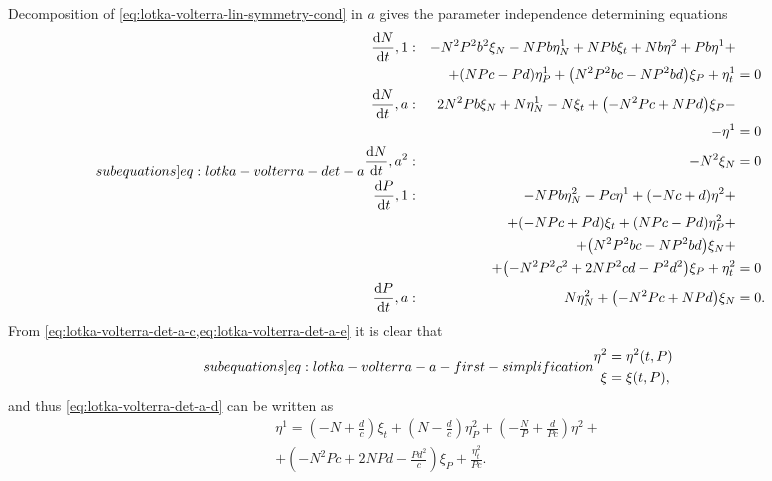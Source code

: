 Decomposition of \cref{eq:lotka-volterra-lin-symmetry-cond} in \(a\) gives the parameter independence determining equations
\begin{subequations} \label[subequations]{eq:lotka-volterra-det-a}
  \begin{flalign}
    \diff{N}{t}, 1 & : & - N^{2} P^{2} b^{2} \xi_{N} - N P b \eta^1_{N} + N P b \xi_{t} + N b \eta^{2} + P b \eta^{1} +&&\\
    &&\quad+ \left(N P c - P d\right) \eta^1_{P} + \left(N^{2} P^{2} b c - N P^{2} b d\right) \xi_{P} + \eta^1_{t} &= 0 &\label{eq:lotka-volterra-det-a-a}\\
    \diff{N}{t}, a & : & 2 N^{2} P b \xi_{N} + N \eta^1_{N} - N \xi_{t} + \left(- N^{2} P c + N P d\right) \xi_{P} -&&\\
    &&\quad- \eta^{1} &= 0 &\label{eq:lotka-volterra-det-a-b}\\
    \diff{N}{t}, a^2 & : & - N^{2} \xi_{N} &= 0 &\label{eq:lotka-volterra-det-a-c}\\
    \diff{P}{t}, 1 & : & - N P b \eta^2_{N} - P c \eta^{1} + \left(- N c + d\right) \eta^{2} +&&\\
    &&\quad+  \left(- N P c + P d\right) \xi_{t} + \left(N P c - P d\right) \eta^2_{P} +&&\\
    &&\quad+ \left(N^{2} P^{2} b c - N P^{2} b d\right) \xi_{N} +&&\\
    &&\quad+ \left(- N^{2} P^{2} c^{2} + 2 N P^{2} c d - P^{2} d^{2}\right) \xi_{P} + \eta^2_{t} &= 0 &\label{eq:lotka-volterra-det-a-d}\\
    \diff{P}{t}, a & : & N \eta^2_{N} + \left(- N^{2} P c + N P d\right) \xi_{N} &= 0. &\label{eq:lotka-volterra-det-a-e}
  \end{flalign}
\end{subequations}
From \cref{eq:lotka-volterra-det-a-c,eq:lotka-volterra-det-a-e} it is clear that
\begin{subequations} \label[subequations]{eq:lotka-volterra-a-first-simplification}
  \begin{align}
    \eta^2 &= \eta^2(t, P)\\
    \xi &= \xi(t, P),
  \end{align}
\end{subequations}
and thus \cref{eq:lotka-volterra-det-a-d} can be written as
\begin{multline*}
  \eta^{1} = \left(- N + \frac{d}{c}\right) \xi_{t} + \left(N - \frac{d}{c}\right) \eta^2_{P} + \left(- \frac{N}{P} + \frac{d}{P c}\right) \eta^{2} +\\
  + \left(- N^{2} P c + 2 N P d - \frac{P d^{2}}{c}\right) \xi_{P} + \frac{\eta^2_{t}}{P c}.
\end{multline*}
